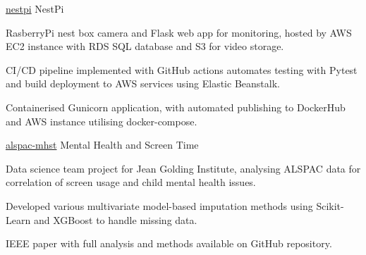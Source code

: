 \begin{cvprojects}
\cvproject
    {\href{https://github.com/kaihulme/nestpi}{\faGithubSquare\acvHeaderIconSep nestpi}} %
    {NestPi} %
    {\begin{cvitems}
        \item RasberryPi nest box camera and Flask web app for monitoring, hosted by AWS EC2 instance with RDS SQL database and S3 for video storage.
        \item CI/CD pipeline implemented with GitHub actions automates testing with Pytest and build deployment to AWS services using Elastic Beanstalk.
        \item Containerised Gunicorn application, with automated publishing to DockerHub and AWS instance utilising docker-compose.      \end{cvitems}
    }
    

\cvproject
    {\href{https://github.com/kaihulme/alspac-mhst}{\faGithubSquare\acvHeaderIconSep alspac-mhst}} %
    {Mental Health and Screen Time} %
    {\begin{cvitems}
        \item Data science team project for Jean Golding Institute, analysing ALSPAC data for correlation of screen usage and child mental health issues.
        \item Developed various multivariate model-based imputation methods using Scikit-Learn and XGBoost to handle missing data.
        \item IEEE paper with full analysis and methods available on GitHub repository.
      \end{cvitems}
    }
    

\end{cvprojects}
